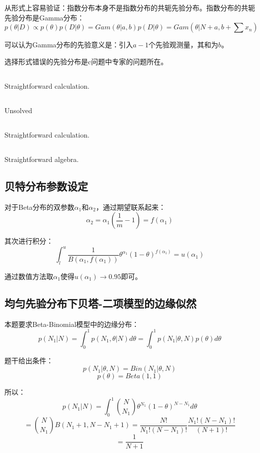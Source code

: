 \documentclass[UTF8]{ctexart}
\begin{document}
从形式上容易验证：指数分布本身不是指数分布的共轭先验分布。指数分布的共轭先验分布是Gamma分布：
$$p(\theta|D) \propto p(\theta)p(D|\theta) = Gam(\theta|a,b)p(D|\theta) = Gam(\theta|N+a,b+\sum x_{n})$$

可以认为Gamma分布的先验意义是：引入$a-1$个先验观测量，其和为$b$。

选择形式错误的先验分布是c问题中专家的问题所在。

\subsection{}
Straightforward calculation.

\subsection{}
Unsolved

\subsection{}
Straightforward calculation.

\subsection{}
Straightforward algebra.

\subsection{贝特分布参数设定}
对于Beta分布的双参数$\alpha_{1}$和$\alpha_{2}$，通过期望联系起来：
$$\alpha_{2}=\alpha_{1}(\frac{1}{m}-1)=f(\alpha_{1})$$

其次进行积分：
$$\int_{l}^{u} \frac{1}{B(\alpha_{1},f(\alpha_{1}))}\theta^{\alpha_{1}}(1-\theta)^{f(\alpha_{1})}=u(\alpha_{1})$$

通过数值方法取$\alpha_{1}$使得$u(\alpha_{1}) \rightarrow 0.95$即可。

\subsection{均匀先验分布下贝塔-二项模型的边缘似然}
本题要求Beta-Binomial模型中的边缘分布：
$$p(N_{1}|N)=\int_{0}^{1} p(N_{1},\theta|N) d\theta = \int_{0}^{1} p(N_{1}|\theta,N)p(\theta)d\theta$$

题干给出条件：
$$p(N_{1}|\theta,N)=Bin(N_{1}|\theta,N)$$
$$p(\theta) = Beta(1,1)$$

所以：
$$p(N_{1}|N)=\int_{0}^{1} \binom{N}{N_{1}} \theta^{N_{1}} (1-\theta)^{N-N_{1}} d\theta $$
$$=\binom{N}{N_{1}}B(N_{1} +1,N-N_{1}+1)=\frac{N!}{N_{1}!(N-N_{1})!}\frac{N_{1}!(N-N_{1})!}{(N+1)!}$$
$$=\frac{1}{N+1}$$
\end{document}
